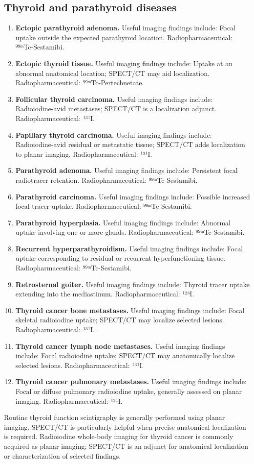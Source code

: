 \subsection{Thyroid and parathyroid diseases}
\begin{enumerate}[leftmargin=*,itemsep=0.45em,topsep=0.4em]
\item \textbf{Ectopic parathyroid adenoma.} Useful imaging findings include: Focal uptake outside the expected parathyroid location. Radiopharmaceutical: ⁹⁹ᵐTc-Sestamibi.
\item \textbf{Ectopic thyroid tissue.} Useful imaging findings include: Uptake at an abnormal anatomical location; SPECT/CT may aid localization. Radiopharmaceutical: ⁹⁹ᵐTc-Pertechnetate.
\item \textbf{Follicular thyroid carcinoma.} Useful imaging findings include: Radioiodine-avid metastases; SPECT/CT is a localization adjunct. Radiopharmaceutical: ¹³¹I.
\item \textbf{Papillary thyroid carcinoma.} Useful imaging findings include: Radioiodine-avid residual or metastatic tissue; SPECT/CT adds localization to planar imaging. Radiopharmaceutical: ¹³¹I.
\item \textbf{Parathyroid adenoma.} Useful imaging findings include: Persistent focal radiotracer retention. Radiopharmaceutical: ⁹⁹ᵐTc-Sestamibi.
\item \textbf{Parathyroid carcinoma.} Useful imaging findings include: Possible increased focal tracer uptake. Radiopharmaceutical: ⁹⁹ᵐTc-Sestamibi.
\item \textbf{Parathyroid hyperplasia.} Useful imaging findings include: Abnormal uptake involving one or more glands. Radiopharmaceutical: ⁹⁹ᵐTc-Sestamibi.
\item \textbf{Recurrent hyperparathyroidism.} Useful imaging findings include: Focal uptake corresponding to residual or recurrent hyperfunctioning tissue. Radiopharmaceutical: ⁹⁹ᵐTc-Sestamibi.
\item \textbf{Retrosternal goiter.} Useful imaging findings include: Thyroid tracer uptake extending into the mediastinum. Radiopharmaceutical: ¹²³I.
\item \textbf{Thyroid cancer bone metastases.} Useful imaging findings include: Focal skeletal radioiodine uptake; SPECT/CT may localize selected lesions. Radiopharmaceutical: ¹³¹I.
\item \textbf{Thyroid cancer lymph node metastases.} Useful imaging findings include: Focal radioiodine uptake; SPECT/CT may anatomically localize selected lesions. Radiopharmaceutical: ¹³¹I.
\item \textbf{Thyroid cancer pulmonary metastases.} Useful imaging findings include: Focal or diffuse pulmonary radioiodine uptake, generally assessed on planar imaging. Radiopharmaceutical: ¹³¹I.
\end{enumerate}
Routine thyroid function scintigraphy is generally performed using planar imaging. SPECT/CT is particularly helpful when precise anatomical localization is required.
Radioiodine whole-body imaging for thyroid cancer is commonly acquired as planar imaging; SPECT/CT is an adjunct for anatomical localization or characterization of selected findings.

